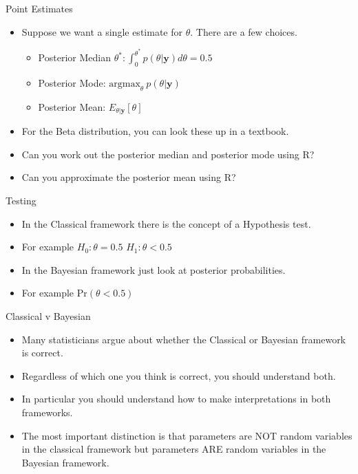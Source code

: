 \documentclass[10pt]{beamer}
\begin{document}
\begin{frame}{Point Estimates}
  \begin{itemize}
  \item Suppose we want a single estimate for $\theta$.  There
    are a few choices.

    \begin{itemize}

    \item Posterior Median $\theta^*: \int\nolimits_{0}^{\theta^*}p(\theta|{\bm y})d\theta=0.5$

    \item Posterior Mode: $\mathrm{arg max}_\theta ~p(\theta|{\bm y})$

    \item Posterior Mean: $E_{\theta|{\bm y}}[\theta]$
    \end{itemize}

  \item For the Beta distribution, you can look these up in a textbook.

  \item Can you work out the posterior median and posterior mode using R?

  \item Can you approximate the posterior mean using R?
  \end{itemize}
\end{frame}
\begin{frame}{Testing}
  \begin{itemize}
  \item In the Classical framework there is the concept of a Hypothesis test.

  \item For example $H_0:\theta=0.5$ $H_1:\theta<0.5$

  \item In the Bayesian framework just look at posterior probabilities.

  \item For example $\mbox{Pr}(\theta<0.5)$
  \end{itemize}
\end{frame}
\begin{frame}{Classical v Bayesian}
  \begin{itemize}
  \item Many statisticians argue about whether the Classical or Bayesian framework is correct.

  \item Regardless of which one you think is correct, you should understand both.

  \item In particular you should understand how to make interpretations in both frameworks.

  \item The most important distinction is that parameters are NOT random variables in the classical framework but parameters ARE random variables in the Bayesian framework.
  \end{itemize}
\end{frame}
\end{document}
